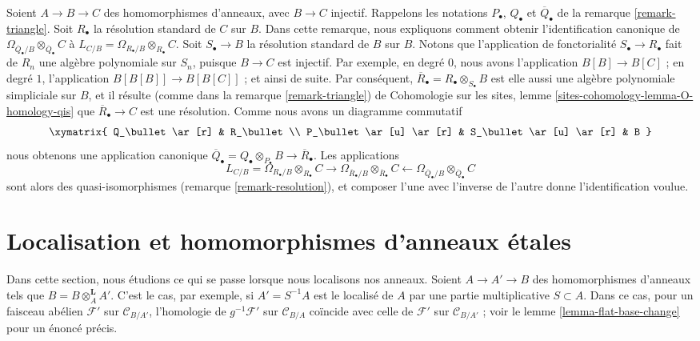 \begin{remark}
\label{remark-explicit-map}
Soient $A \to B \to C$ des homomorphismes d'anneaux, avec $B \to C$
injectif. Rappelons les notations $P_\bullet$, $Q_\bullet$ et
$\overline{Q}_\bullet$ de la remarque \ref{remark-triangle}. Soit
$R_\bullet$ la résolution standard de $C$ sur $B$. Dans cette remarque,
nous expliquons comment obtenir l'identification canonique de
$\Omega_{\overline{Q}_\bullet/B} \otimes_{\overline{Q}_\bullet} C$ à
$L_{C/B} = \Omega_{R_\bullet/B} \otimes_{R_\bullet} C$. Soit
$S_\bullet \to B$ la résolution standard de $B$ sur $B$. Notons que
l'application de fonctorialité $S_\bullet \to R_\bullet$ fait de $R_n$ une
algèbre polynomiale sur $S_n$, puisque $B \to C$ est injectif.
Par exemple, en degré $0$, nous avons l'application $B[B] \to B[C]$ ; en
degré $1$, l'application $B[B[B]] \to B[B[C]]$ ; et ainsi de suite. Par
conséquent,
$\overline{R}_\bullet = R_\bullet \otimes_{S_\bullet} B$
est elle aussi une algèbre polynomiale simpliciale sur $B$, et il résulte
(comme dans la remarque \ref{remark-triangle}) de Cohomologie sur les sites,
lemme
\ref{sites-cohomology-lemma-O-homology-qis}
que $\overline{R}_\bullet \to C$ est une résolution. Comme nous avons un
diagramme commutatif
$$
\xymatrix{
Q_\bullet \ar[r] & R_\bullet \\
P_\bullet \ar[u] \ar[r] & S_\bullet \ar[u] \ar[r] & B
}
$$
nous obtenons une application canonique
$\overline{Q}_\bullet = Q_\bullet \otimes_{P_\bullet} B \to
\overline{R}_\bullet$. Les applications
$$
L_{C/B} = \Omega_{R_\bullet/B} \otimes_{R_\bullet} C
\longrightarrow
\Omega_{\overline{R}_\bullet/B} \otimes_{\overline{R}_\bullet} C
\longleftarrow
\Omega_{\overline{Q}_\bullet/B} \otimes_{\overline{Q}_\bullet} C
$$
sont alors des quasi-isomorphismes (remarque \ref{remark-resolution}), et
composer l'une avec l'inverse de l'autre donne l'identification voulue.
\end{remark}





\section{Localisation et homomorphismes d'anneaux \'etales}
\label{section-localization}

\noindent
Dans cette section, nous étudions ce qui se passe lorsque nous localisons nos
anneaux. Soient $A \to A' \to B$ des homomorphismes d'anneaux tels que
$B = B \otimes_A^\mathbf{L} A'$. C'est le cas, par exemple, si
$A' = S^{-1}A$ est le localisé de $A$ par une partie multiplicative
$S \subset A$. Dans ce cas, pour un faisceau abélien $\mathcal{F}'$ sur
$\mathcal{C}_{B/A'}$, l'homologie de $g^{-1}\mathcal{F}'$ sur
$\mathcal{C}_{B/A}$ coïncide avec celle de $\mathcal{F}'$ sur
$\mathcal{C}_{B/A'}$ ; voir le lemme \ref{lemma-flat-base-change} pour un
énoncé précis.

